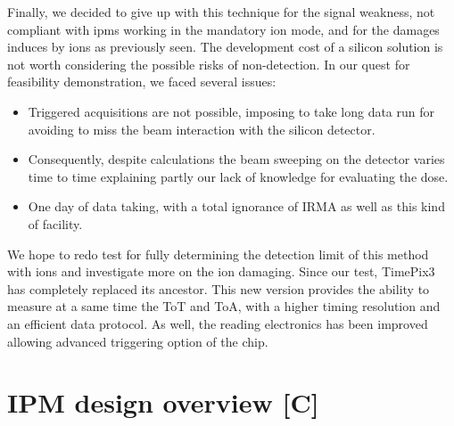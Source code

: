 \begin{refsection}
  Finally, we decided to give up with this technique for the signal weakness, not compliant with \acrshort{ipm}s working in the mandatory ion mode, and for the damages induces by ions as previously seen. The development cost of a silicon solution is not worth considering the possible risks of non-detection.
  In our quest for feasibility demonstration, we faced several issues:
  \begin{itemize}
    \item Triggered acquisitions are not possible, imposing to take long data run for avoiding to miss the beam interaction with the silicon detector.
    \item Consequently, despite calculations the beam sweeping on the detector varies time to time explaining partly our lack of knowledge for evaluating the dose.
    \item One day of data taking, with a total ignorance of IRMA as well as this kind of facility.
  \end{itemize}

  We hope to redo test for fully determining the detection limit of this method with ions and investigate more on the ion damaging.
  Since our test, TimePix3 has completely replaced its ancestor. This new version provides the ability to measure at a same time the ToT and ToA, with a higher timing resolution and an efficient data protocol. As well, the reading electronics has been improved allowing advanced triggering option of the chip.



  \section{IPM design overview [C]}

\end{refsection}

